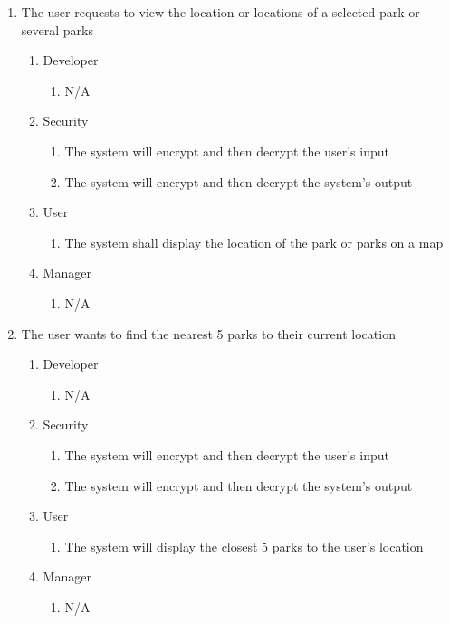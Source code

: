 \documentclass[titlepage]{article}
\begin{document}
\begin{enumerate}[{BE}1.]
    \item The user requests to view the location or locations of a selected park or several parks
    \begin{enumerate}[{VP\theenumi}.1]
        \item Developer
            \begin{enumerate}
                \item N/A
            \end{enumerate}
        \item Security
            \begin{enumerate}
                \item The system will encrypt and then decrypt the user's input
                \item The system will encrypt and then decrypt the system's output
            \end{enumerate}
        \item User
            \begin{enumerate}
                \item The system shall display the location of the park or parks on a map
            \end{enumerate}
        \item Manager
            \begin{enumerate}
                \item N/A
            \end{enumerate}
    \end{enumerate}

    \item The user wants to find the nearest 5 parks to their current location
    \begin{enumerate}[{VP\theenumi}.1]
        \item Developer
            \begin{enumerate}
                \item N/A
            \end{enumerate}
        \item Security
            \begin{enumerate}
                \item The system will encrypt and then decrypt the user's input
                \item The system will encrypt and then decrypt the system's output
            \end{enumerate}
        \item User
            \begin{enumerate}
                \item The system will display the closest 5 parks to the user's location
            \end{enumerate}
        \item Manager
            \begin{enumerate}
                \item N/A
            \end{enumerate}
    \end{enumerate}

\end{enumerate}
\end{document}
